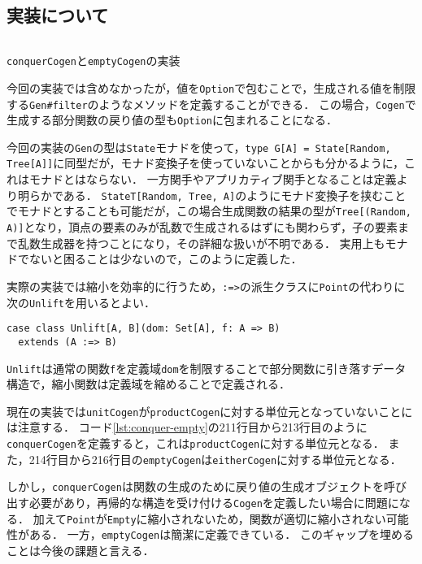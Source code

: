 \documentclass[submit,PRO]{ipsj}
\theoremstyle{definition}
\begin{document}
\subsection{実装について}

\begin{listing*}[hbt]
  \inputminted[breaklines,autogobble,linenos,firstline=211,lastline=216]{scala}{../src/main/scala/minicheck.scala}
  \caption{\texttt{conquerCogen}と\texttt{emptyCogen}の実装}
  \label{lst:conquer-empty}
\end{listing*}

今回の実装では含めなかったが，値を\texttt{Option}で包むことで，生成される値を制限する\texttt{Gen\#filter}のようなメソッドを定義することができる．
この場合，\texttt{Cogen}で生成する部分関数の戻り値の型も\texttt{Option}に包まれることになる．

今回の実装の\texttt{Gen}の型は\texttt{State}モナドを使って，\texttt{type G[A] = State[Random, Tree[A]]}に同型だが，モナド変換子を使っていないことからも分かるように，これはモナドとはならない．
一方関手やアプリカティブ関手となることは定義より明らかである．
\texttt{StateT[Random, Tree, A]}のようにモナド変換子を挟むことでモナドとすることも可能だが，この場合生成関数の結果の型が\texttt{Tree[(Random, A)]}となり，頂点の要素のみが乱数で生成されるはずにも関わらず，子の要素まで乱数生成器を持つことになり，その詳細な扱いが不明である．
実用上もモナドでないと困ることは少ないので，このように定義した．

実際の実装では縮小を効率的に行うため，\texttt{:=>}の派生クラスに\texttt{Point}の代わりに次の\texttt{Unlift}を用いるとよい．

\begin{verbatim}
case class Unlift[A, B](dom: Set[A], f: A => B)
  extends (A :=> B)
\end{verbatim}

\texttt{Unlift}は通常の関数\texttt{f}を定義域\texttt{dom}を制限することで部分関数に引き落すデータ構造で，縮小関数は定義域を縮めることで定義される．

現在の実装では\texttt{unitCogen}が\texttt{productCogen}に対する単位元となっていないことには注意する．
コード\ref{lst:conquer-empty}の211行目から213行目のように\texttt{conquerCogen}を定義すると，これは\texttt{productCogen}に対する単位元となる．
また，214行目から216行目の\texttt{emptyCogen}は\texttt{eitherCogen}に対する単位元となる．

しかし，\texttt{conquerCogen}は関数の生成のために戻り値の生成オブジェクトを呼び出す必要があり，再帰的な構造を受け付ける\texttt{Cogen}を定義したい場合に問題になる．
加えて\texttt{Point}が\texttt{Empty}に縮小されないため，関数が適切に縮小されない可能性がある．
一方，\texttt{emptyCogen}は簡潔に定義できている．
このギャップを埋めることは今後の課題と言える．
\end{document}
